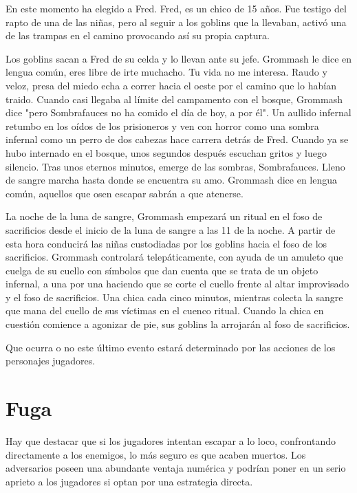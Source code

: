 \documentclass[10pt,twoside,twocolumn,openany]{dndbook}
\begin{document}
En este momento ha elegido a Fred. Fred, es un chico de 15 años. Fue testigo del rapto de una de las 
niñas, pero al seguir a los goblins que la llevaban, activó una de las trampas en el camino provocando 
así su propia captura.

\begin{DndReadAloud}
Los goblins sacan a Fred de su celda y lo llevan ante su jefe. Grommash le dice en lengua común, eres 
libre de irte muchacho. Tu vida no me interesa. Raudo y veloz, presa del miedo echa a correr hacia el 
oeste por el camino que lo habían traido. Cuando casi llegaba al límite del campamento con el bosque, 
Grommash dice "pero Sombrafauces no ha comido el día de hoy, a por él". Un aullido infernal retumbo 
en los oídos de los prisioneros y ven con horror como una sombra infernal como un perro de dos cabezas 
hace carrera detrás de Fred. Cuando ya se hubo internado en el bosque, unos segundos después escuchan 
gritos y luego silencio. Tras unos eternos minutos, emerge de las sombras, Sombrafauces. Lleno de sangre 
marcha hasta donde se encuentra su amo. Grommash dice en lengua común, aquellos que osen escapar 
sabrán a que atenerse.
\end{DndReadAloud}

La noche de la luna de sangre, Grommash empezará un ritual en el foso de sacrificios desde el inicio de la 
luna de sangre a las 11 de la noche. A partir de esta hora conducirá las niñas custodiadas por los 
goblins hacia el foso de los sacrificios. Grommash controlará telepáticamente, con ayuda de un 
amuleto que cuelga de su cuello con símbolos que dan cuenta que se trata de un objeto infernal, 
a una por una haciendo que se corte el cuello frente al altar improvisado y el foso de sacrificios. 
Una chica cada cinco minutos, mientras colecta la sangre que mana del cuello de sus víctimas en el 
cuenco ritual. Cuando la chica en cuestión comience a agonizar de pie, sus goblins la arrojarán al 
foso de sacrificios.

Que ocurra o no este último evento estará determinado por las acciones de los personajes jugadores.

\section{Fuga}

Hay que destacar que si los jugadores intentan escapar a lo loco, confrontando directamente a los 
enemigos, lo más seguro es que acaben muertos. Los adversarios poseen una abundante ventaja numérica y 
podrían poner en un serio aprieto a los jugadores si optan por una estrategia directa.
\end{document}
